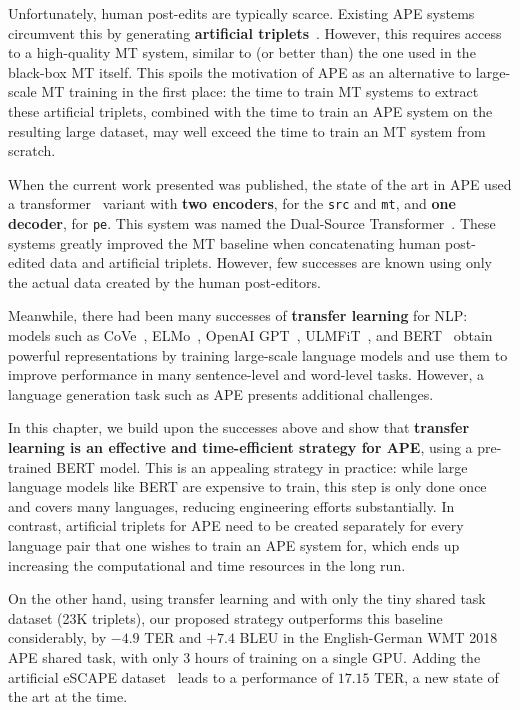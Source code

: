Unfortunately, human post-edits are typically scarce. Existing APE
systems circumvent this by generating {\bf artificial
        triplets}~\citep{junczys2016log, negri2018escape}. However, this
requires access to a high-quality MT system, similar to (or better
than) the one used in the black-box MT itself. This spoils the
motivation of APE as an alternative to large-scale MT training in the
first place: the time to train MT systems to extract these artificial
triplets, combined with the time to train an APE system on the
resulting large dataset, may well exceed the time to train an MT
system from scratch.

When the current work presented was published, the state of the art
in APE used a transformer~\citep{vaswani2017attention} variant with
    {\bf two encoders}, for the {\tt src} and {\tt mt}, and {\bf one
        decoder}, for {\tt pe}. This system was named the Dual-Source
Transformer~\citep{junczys2018ms, tebbifakhr2018multi}. These systems
greatly improved the MT baseline when concatenating human post-edited
data and artificial triplets. However, few successes are known using
only the actual data created by the human post-editors.

Meanwhile, there had been many successes of {\bf transfer learning}
for NLP: models such as CoVe~\citep{mccann2017learned},
ELMo~\citep{peters2018deep}, OpenAI GPT~\citep{radford2018improving},
ULMFiT~\citep{howard2018universal}, and BERT~\citep{devlin2018bert}
obtain powerful representations by training large-scale language
models and use them to improve performance in many sentence-level and
word-level tasks. However, a language generation task such as APE
presents additional challenges.

In this chapter, we build upon the successes above and show that {\bf
        transfer learning is an effective and time-efficient strategy for
        APE}, using a pre-trained BERT model. This is an appealing strategy
in practice: while large language models like BERT are expensive to
train, this step is only done once and covers many languages,
reducing engineering efforts substantially. In contrast, artificial
triplets for APE need to be created separately for every language
pair that one wishes to train an APE system for, which ends up
increasing the computational and time resources in the long run.

On the other hand, using transfer learning and with only the tiny shared
task dataset (23K triplets), our proposed strategy outperforms this
baseline considerably, by $-4.9$ TER and $+7.4$ BLEU in the
English-German WMT 2018 APE shared task, with only 3 hours of training on
a single GPU. Adding the artificial eSCAPE
dataset~\citep{negri2018escape} leads to a performance of $17.15$ TER,
a new state of the art at the time.

